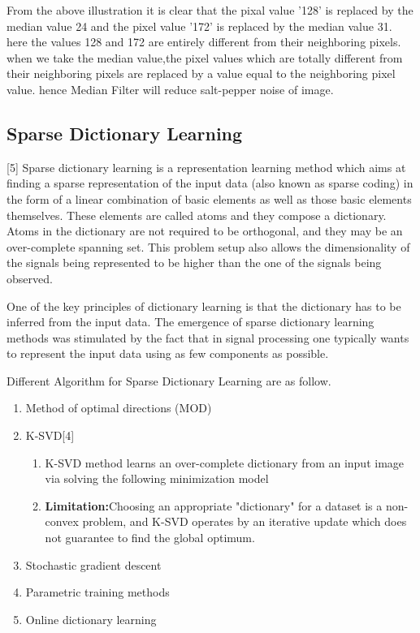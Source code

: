 \documentclass[journal]{IEEEtran}
\begin{document}
	From the above illustration it is clear that the pixal value '128' is replaced by the median value 24 and the pixel value '172' is replaced by the median value 31. here the values 128 and 172 are entirely different from their neighboring pixels. when we take the median value,the pixel values which are totally different from their neighboring pixels are replaced by a value equal to the neighboring pixel value. hence Median Filter will reduce salt-pepper noise of image. 
	\subsection{\textbf{Sparse Dictionary Learning}}[5]
	Sparse dictionary learning is a representation learning method which aims at finding a sparse representation of the input data (also known as sparse coding) in the form of a linear combination of basic elements as well as those basic elements themselves. These elements are called atoms and they compose a dictionary. Atoms in the dictionary are not required to be orthogonal, and they may be an over-complete spanning set. This problem setup also allows the dimensionality of the signals being represented to be higher than the one of the signals being observed.
	
	One of the key principles of dictionary learning is that the dictionary has to be inferred from the input data. The emergence of sparse dictionary learning methods was stimulated by the fact that in signal processing one typically wants to represent the input data using as few components as possible.
	
	Different Algorithm for Sparse Dictionary Learning are as follow.
	\begin{enumerate}
		\item Method of optimal directions (MOD)
		\item K-SVD[4]
		\begin{enumerate}
			\item K-SVD method learns an over-complete
			dictionary from an input image via solving the following minimization model
			\item \textbf{Limitation:}Choosing an appropriate "dictionary" for a dataset is a non-convex problem, and K-SVD operates by an iterative update which does not guarantee to find the global optimum.
			
		\end{enumerate}
		\item Stochastic gradient descent
		\item Parametric training methods
		\item Online dictionary learning
	\end{enumerate}
\end{document}
